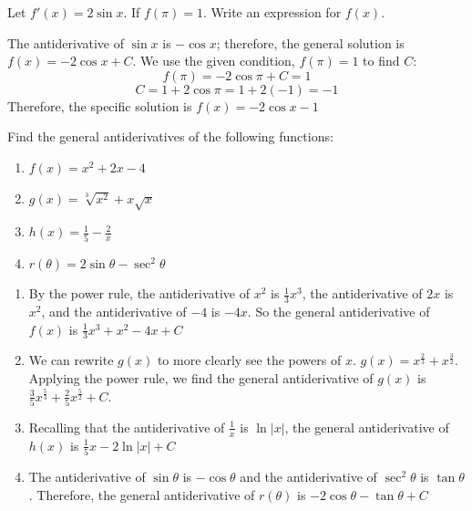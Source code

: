 \begin{Exercise}[label=antideriv2]
	Let $f'(x) = 2\sin{x}$. If $f(\pi) = 1$. Write an expression for 
	$f(x)$. 
\end{Exercise}

\begin{Answer}[ref=antideriv2]
	The antiderivative of $\sin{x}$ is $-\cos{x}$; therefore, the 
	general solution is $f(x) = -2\cos{x} + C$. We use the given 
	condition, $f(\pi) = 1$ to find $C$:
	$$f(\pi) = -2\cos{\pi} + C = 1$$
	$$C = 1 + 2\cos{\pi} = 1 + 2(-1) = -1$$
	Therefore, the specific solution is $f(x) = -2\cos{x} - 1$
\end{Answer}

\begin{Exercise}[label=antideriv3]
	Find the general antiderivatives of the following functions:
	\begin{enumerate}
	\item $f(x) = x^2 + 2x - 4$
	\item $g(x) = \sqrt[3]{x^2} + x\sqrt{x}$
	\item $h(x) = \frac{1}{5} - \frac{2}{x}$
	\item $r(\theta) = 2\sin{\theta} - \sec^2{\theta}$
	\end{enumerate} 	
\end{Exercise}

\begin{Answer}[ref=antideriv3]
	\begin{enumerate}
	\item By the power rule, the antiderivative of $x^2$ is 
	$\frac{1}{3}x^3$, the antiderivative of $2x$ is $x^2$, and the antiderivative of $-4$ is $-4x$. So the general antiderivative of $f(x)$ 
	is $\frac{1}{3}x^3 + x^2 - 4x + C$
	\item We can rewrite $g(x)$ to more clearly see the powers of $x$. 
	$g(x) = x^{\frac{2}{3}} + x^{\frac{3}{2}}$. Applying the power rule, 
	we find the general antiderivative of $g(x)$ is 
	$\frac{3}{5}x^{\frac{5}{3}} + \frac{2}{5}x^{\frac{5}{2}} + C$. 
	\item Recalling that the antiderivative of $\frac{1}{x}$ is 
	$\ln{|x|}$, the general antiderivative of $h(x)$ is $\frac{1}{5}x - 
	2\ln{|x|} + C$
	\item The antiderivative of $\sin{\theta}$ is $-\cos{\theta}$ and the 
	antiderivative of $\sec^2{\theta}$ is $\tan{\theta}$. Therefore, the 
	general antiderivative of $r(\theta)$ is $-2\cos{\theta} - 
	\tan{\theta} + C$
	\end{enumerate}
\end{Answer}

